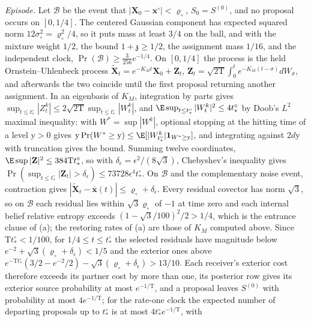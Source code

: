 \emph{Episode.} Let \(\mathscr B\) be the event that
\(|\mathbf X_0-\mathbf x^\circ|<\varrho_\circ\), \(S_0=S^{(0)}\), and no proposal
occurs on \([0,1/4]\). The centered Gaussian component has expected squared
norm \(12\sigma_\circ^2=\varrho_\circ^2/4\), so it puts mass at least \(3/4\) on
the ball, and with the mixture weight \(1/2\), the bound
\(1+\mathfrak z\ge1/2\), the assignment mass \(1/16\), and the independent
clock, \(\Pr(\mathscr B)\ge\tfrac3{256}e^{-1/4}\). On \([0,1/4]\) the process is
the held Ornstein--Uhlenbeck process
\(\widetilde{\mathbf X}_t=e^{-K_Mt}\mathbf X_0+\mathbf Z_t\),
\(\mathbf Z_t=\sqrt{2\mathrm T}\int_0^te^{-K_M(t-\sigma)}dW_\sigma\), and afterwards
the two coincide until the first proposal returning another assignment. In an
eigenbasis of \(K_M\), integration by parts gives
\(\sup_{t\le t^\circ_*}|Z^k_t|\le2\sqrt{2\mathrm T}\sup_{t\le t^\circ_*}|W^k_t|\),
and \(\E\sup_{t\le t^\circ_*}|W^k_t|^2\le4t^\circ_*\) by Doob's \(L^2\)
maximal inequality: with \(W^*=\sup|W^k|\), optional stopping at the hitting
time of a level \(\mathrm y>0\) gives
\(\mathrm y\Pr(W^*\ge\mathrm y)\le\E[|W^k_{t^\circ_*}|\mathbf 1_{W^*\ge\mathrm y}]\),
and integrating against \(2 d\mathrm y\) with truncation gives the bound.
Summing twelve coordinates, \(\E\sup|\mathbf Z|^2\le384\mathrm Tt^\circ_*\), so
with \(\delta_\epsilon=\epsilon^2/(8\sqrt3)\), Chebyshev's inequality gives
\(\Pr(\sup_{t\le t^\circ_*}|\mathbf Z_t|>\delta_\epsilon)\le73728 \epsilon^4t^\circ_*\).
On \(\mathscr B\) and the complementary noise event, contraction gives
\(|\widetilde{\mathbf X}_t-\bar{\mathbf x}(t)|\le\varrho_\circ+\delta_\epsilon\).
Every residual covector has norm \(\sqrt3\), so on \(\mathscr B\) each
residual lies within \(\sqrt3\varrho_\circ\) of \(-1\) at time zero and each
internal belief relative entropy exceeds \((1-\sqrt3/100)^2/2>1/4\), which is
the entrance clause of (a); the restoring rates of (a) are those of \(K_M\)
computed above. Since \(\mathrm Tt^\circ_*<1/100\),
for \(1/4\le t\le t^\circ_*\) the selected residuals have magnitude below
\(e^{-2}+\sqrt3(\varrho_\circ+\delta_\epsilon)<1/5\) and the exterior ones above
\(e^{-\mathrm Tt^\circ_*}(3/2-e^{-2}/2)-\sqrt3(\varrho_\circ+\delta_\epsilon)>13/10\).
Each receiver's exterior cost therefore exceeds its partner cost by more than
one, its posterior row gives its exterior source probability at most
\(e^{-1/\mathrm T}\), and a proposal leaves \(S^{(0)}\) with probability at most
\(4e^{-1/\mathrm T}\); for the rate-one clock the expected number of departing
proposals up to \(t^\circ_*\) is at most \(4t^\circ_*e^{-1/\mathrm T}\), with
